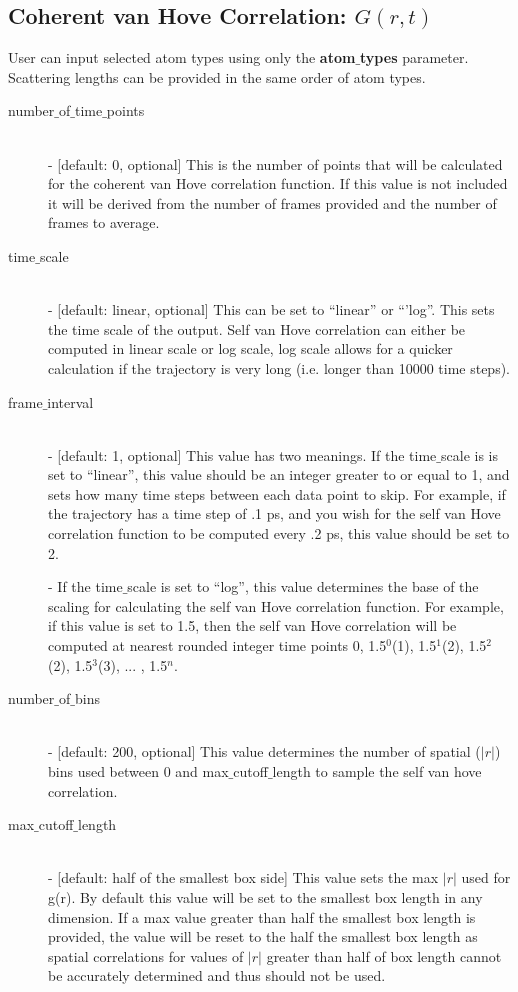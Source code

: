 \documentclass{article}
\begin{document}
\subsection{Coherent van Hove Correlation: $G(r,t)$} \label{sec::Grt_parm}
User can input selected atom types using only the \textbf{atom$\_$types} parameter. Scattering lengths can be provided in the same order of atom types.
\begin{description}	
	\item[number$\_$of$\_$time$\_$points]\hfill \\
	- [default: 0, optional] This is the number of points that will be calculated for the coherent van Hove correlation function.  If this value is not included it will be derived from the number of frames provided and the number of frames to average.
	
	\item[time$\_$scale] \hfill \\
	- [default: linear, optional] This can be set to ``linear'' or ``'log''.  This sets the time scale of the output. Self van Hove correlation can either be computed in linear scale or log scale, log scale allows for a quicker calculation if the trajectory is very long (i.e. longer than 10000 time steps).
	
	\item[frame$\_$interval] \hfill \\
	- [default: 1, optional] This value has two meanings.  If the time$\_$scale is is set to ``linear'', this value should be an integer greater to or equal to 1, and sets how many time steps between each data point to skip.  For example, if the trajectory has a time step of .1 ps, and you wish for the self van Hove correlation function to be computed every .2 ps, this value should be set to 2. 
	
	- If the time$\_$scale is set to ``log'', this value determines the base of the scaling for calculating the self van Hove correlation function.   For example, if this value is set to 1.5, then the self van Hove correlation will be computed at nearest rounded integer time points 0, 1.5$^0$(1), 1.5$^1$(2), 1.5$^2$(2), 1.5$^3$(3), ... , 1.5$^{n}$.
	
	\item[number$\_$of$\_$bins] \hfill \\
	- [default: 200, optional] This value determines the number of spatial ($|r|$) bins used between 0 and max$\_$cutoff$\_$length to sample the self van hove correlation.
	
	\item[max$\_$cutoff$\_$length] \hfill \\
	- [default: half of the smallest box side] This value sets the max $|r|$ used for g(r).  By default this value will be set to the smallest box length in any dimension.  If a max value greater than half the smallest box length is provided, the value will be reset to the half the smallest box length as spatial correlations for values of $|r|$ greater than half of box length cannot be accurately determined and thus should not be used.
\end{description}
\end{document}
